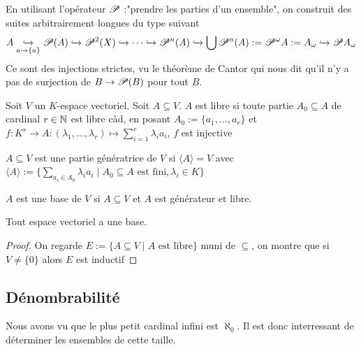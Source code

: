 



En utilisant l'opérateur $\mathscr{P}$ :"prendre les parties d'un ensemble", on construit des suites arbitrairement longues du type suivant
\begin{equation*}
    A\underset{a\to \{a\}}{\hookrightarrow} \mathscr{P}(A) \hookrightarrow \mathscr{P} ^2(X)\hookrightarrow\dots\hookrightarrow \mathscr{P}^n(A)\hookrightarrow \bigcup \mathscr{P}^n(A):=\mathscr{P}^\omega A:=A_\omega\hookrightarrow\mathscr{P} A_\omega
\end{equation*}
Ce sont des injections strictes, vu le théorème de Cantor qui nous dit qu'il n'y a pas de surjection de $B\to \mathscr{P} (B)$ pour tout $B$.



  \begin{definition}
      Soit $V$ un $K$-espace vectoriel. Soit $A\subseteq V$. $A$ est libre si toute partie $A_0\subseteq A$ de cardinal $r\in\mathbb{N}$ est libre càd, en posant $A_0 := \{a_1,\dotsc, a_r\}$ et $f : K^r\to A : (\lambda_1,\dotsc, \lambda_r)\mapsto\sum_{i = 1}^r\lambda_ia_i$, $f$ est injective
  \end{definition}
  \begin{definition}
      $A\subseteq V$ est une partie génératrice de $V$ si $\langle A\rangle = V$ avec $\langle A\rangle := \{\sum_{a_i\in A_0}\lambda_ia_i\mid A_0\subseteq A\text{ est fini}, \lambda_i\in K\}$
  \end{definition}
  \begin{definition}
      $A$ est une base de $V$ si $A\subseteq V$ et $A$ est générateur et libre.
  \end{definition}
  \begin{proposition}
      Tout espace vectoriel a une base.
  \end{proposition}
  \begin{proof}
      On regarde $E:= \{A\subseteq V\mid A \text{ est libre}\}$ muni de $\subseteq$, on montre que si $V\ne\{0\}$ alors $E$ est inductif
  \end{proof}

\subsection{Dénombrabilité}

Nous avons vu que le plus petit cardinal infini est $\aleph_0$. Il est donc interressant de déterminer les ensembles de cette taille. 

